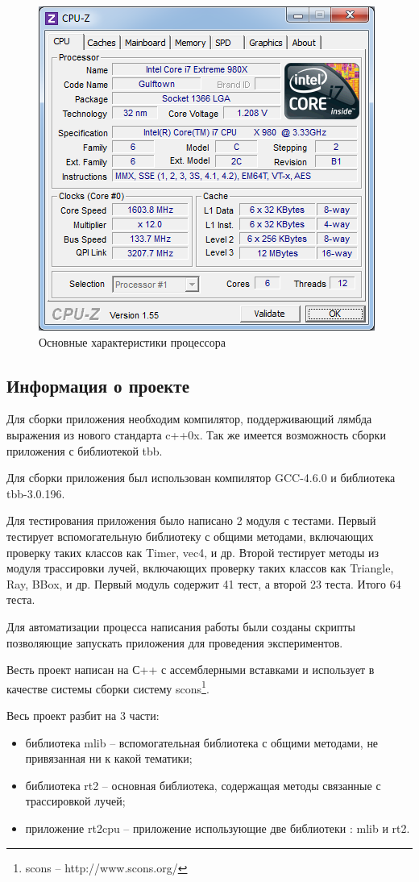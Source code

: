 \documentclass[12pt, a4paper, utf8]{article}
\begin{document}
\begin{figure}[h]
\centering
\includegraphics[scale=1]{imgs/cpu-z.png}
\caption{Основные характеристики процессора}\label{fig:cpuz}
\end{figure}

\subsection{Информация о проекте}

Для сборки приложения необходим компилятор, поддерживающий лямбда выражения из нового стандарта c++0x. Так же имеется возможность сборки приложения с библиотекой tbb. 

Для сборки приложения был использован компилятор GCC-4.6.0 и библиотека tbb-3.0.196.

Для тестирования приложения было написано 2 модуля с тестами. Первый тестирует вспомогательную библиотеку с общими методами, включающих проверку таких классов как Timer, vec4, и др. Второй тестирует методы из модуля трассировки лучей, включающих проверку таких классов как Triangle, Ray, BBox, и др. Первый модуль содержит 41 тест, а второй 23 теста. Итого 64 теста.

Для автоматизации процесса написания работы были созданы скрипты позволяющие запускать приложения для проведения экспериментов.

Весть проект написан на С++ с ассемблерными вставками и использует в качестве системы сборки систему scons\footnote{scons -- http://www.scons.org/}.

Весь проект разбит на 3 части:
\begin{itemize}
\item библиотека mlib -- вспомогательная библиотека с общими методами, не привязанная ни к какой тематики;
\item библиотека rt2 -- основная библиотека, содержащая методы связанные с трассировкой лучей;
\item приложение rt2cpu -- приложение использующие две библиотеки : mlib и rt2.
\end{itemize}
\end{document}
